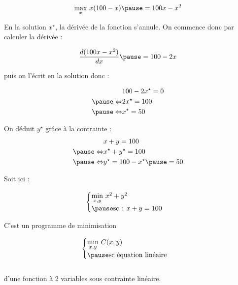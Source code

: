 \documentclass[9pt,handout,professionalfonts,hyperref]{beamer}
\begin{document}
\begin{frame}
\[\begin{aligned}
\underset{x}{\max}~x(100-x) \pause = 100x-x^2 
\end{aligned}\]

\pause En la solution $x^\star$, la dérivée de la fonction s'annule. On commence donc par calculer la dérivée :

\[\begin{aligned}
\frac{d(100x-x^2)}{dx} \pause = 100-2x 
\end{aligned}\]

\pause puis on l'écrit en la solution donc :

\[\begin{aligned}
&100-2x^\star=0\\
\pause \Leftrightarrow&2x^\star=100\\
\pause \Leftrightarrow&x^\star=50\\
\end{aligned}\]
 
\pause On déduit $y^{\star}$ grâce à la contrainte : 
\[\begin{aligned}
&x+y=100  \\
\pause \Leftrightarrow &x^\star+y^\star=100 \\
\pause \Leftrightarrow &y^\star=100-x^\star \pause = 50
\end{aligned}\]

\end{frame}

\begin{frame}

Soit ici : \newline 
	
	\[\begin{aligned}
	\begin{cases}
	\underset{x,y}{\min}~x^2 + y^2 \\
	\pause \text{sc : } x + y =100
	\end{cases}
	\end{aligned}\]\newline 
	

C'est un programme de minimisation 

\[\begin{aligned}
\begin{cases}
\underset{x,y}{\min}~C(x,y) \\
\pause \text{sc équation linéaire}
\end{cases}
\end{aligned}\]\\

d'une fonction à 2 variables sous contrainte linéaire. \pause 

\end{frame}
\end{document}
